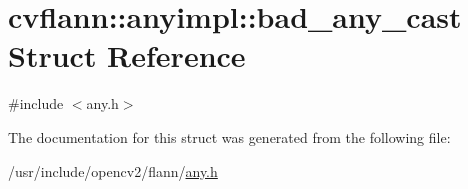 \hypertarget{structcvflann_1_1anyimpl_1_1bad__any__cast}{\section{cvflann\-:\-:anyimpl\-:\-:bad\-\_\-any\-\_\-cast Struct Reference}
\label{structcvflann_1_1anyimpl_1_1bad__any__cast}
}


{\ttfamily \#include $<$any.\-h$>$}



The documentation for this struct was generated from the following file\-:\begin{DoxyCompactItemize}
\item 
/usr/include/opencv2/flann/\hyperlink{any_8h}{any.\-h}\end{DoxyCompactItemize}
